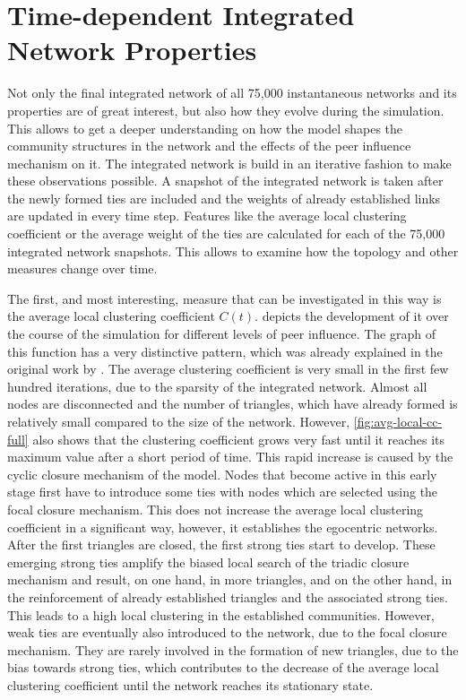 

\section{Time-dependent Integrated Network Properties}
\label{sec:integrated-network-properties}

Not only the final integrated network of all 75,000 instantaneous networks and its properties are of great interest, but also how they evolve during the simulation.
This allows to get a deeper understanding on how the model shapes the community structures in the network and the effects of the peer influence mechanism on it.
The integrated network is build in an iterative fashion to make these observations possible.
A snapshot of the integrated network is taken after the newly formed ties are included and the weights of already established links are updated in every time step.
Features like the average local clustering coefficient or the average weight of the ties are calculated for each of the 75,000 integrated network snapshots.
This allows to examine how the topology and other measures change over time.

The first, and most interesting, measure that can be investigated in this way is the average local clustering coefficient \( C(t) \).
 depicts the development of it over the course of the simulation for different levels of peer influence.
The graph of this function has a very distinctive pattern, which was already explained in the original work by \citet{Laurent2015}.
The average clustering coefficient is very small in the first few hundred iterations, due to the sparsity of the integrated network.
Almost all nodes are disconnected and the number of triangles, which have already formed is relatively small compared to the size of the network.
However, \cref{fig:avg-local-cc-full} also shows that the clustering coefficient grows very fast until it reaches its maximum value after a short period of time.
This rapid increase is caused by the cyclic closure mechanism of the model.
Nodes that become active in this early stage first have to introduce some ties with nodes which are selected using the focal closure mechanism.
This does not increase the average local clustering coefficient in a significant way, however, it establishes the egocentric networks.
After the first triangles are closed, the first strong ties start to develop.
These emerging strong ties amplify the biased local search of the triadic closure mechanism and result, on one hand, in more triangles, and on the other hand, in the reinforcement of already established triangles and the associated strong ties.
This leads to a high local clustering in the established communities.
However, weak ties are eventually also introduced to the network, due to the focal closure mechanism.
They are rarely involved in the formation of new triangles, due to the bias towards strong ties, which contributes to the decrease of the average local clustering coefficient until the network reaches its stationary state.


